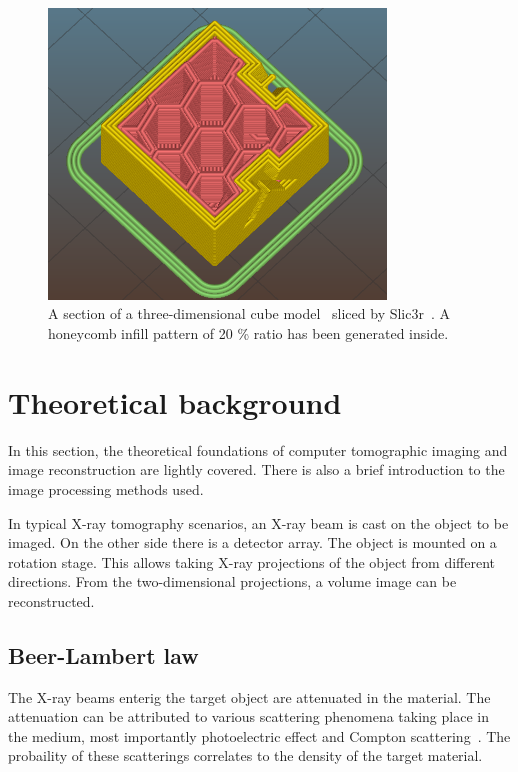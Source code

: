 \documentclass[a4paper,twoside,12pt]{article}
\begin{document}
\begin{figure}
    \centering
    \includegraphics[width=0.8\textwidth]{images/cube_slic3r.png}
    \caption{A section of a three-dimensional cube model~\cite{testcube} sliced by Slic3r~\cite{slic3r}. A honeycomb infill pattern of 20 \% ratio has been generated inside.}
    \label{fig:honeycomb}
\end{figure}

\section{Theoretical background}
In this section, the theoretical foundations of computer tomographic imaging and image reconstruction are lightly covered. There is also a brief introduction to the image processing methods used.

In typical X-ray tomography scenarios, an X-ray beam is cast on the object to be imaged. On the other side there is a detector array. The object is mounted on a rotation stage. This allows taking X-ray projections of the object from different directions. From the two-dimensional projections, a volume image can be reconstructed.

\subsection{Beer-Lambert law}
The X-ray beams enterig the target object are attenuated in the material. The attenuation can be attributed to various scattering phenomena taking place in the medium, most importantly photoelectric effect and Compton scattering~\cite{lectures}. The probaility of these scatterings correlates to the density of the target material.
\end{document}
